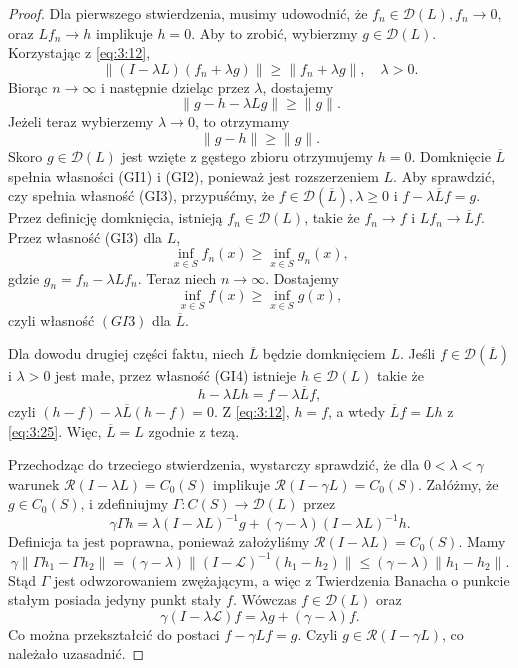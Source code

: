 \documentclass{article}
\begin{document}
	\begin{proof}
		Dla pierwszego stwierdzenia, musimy udowodnić, że
		\( f_n \in \mathcal{D}(L), f_n \to 0 \),
		oraz \( Lf_n \to h \) implikuje \( h = 0 \).
		Aby to zrobić, wybierzmy \( g \in \mathcal{D}(L) \).
		Korzystając z \eqref{eq:3:12},
		\begin{equation*}
			\|(I - \lambda L)(f_n + \lambda g)\|
			\geq \|f_n + \lambda g\|,
			\quad \lambda > 0.
		\end{equation*}
		Biorąc \( n \to \infty \) i następnie dzieląc przez \( \lambda \), dostajemy
		\[
			\|g - h - \lambda Lg\| \geq \|g\|.
		\]
		Jeżeli teraz wybierzemy \( \lambda \to 0 \), to otrzymamy
		\begin{equation*}
			\| g-h \| \geq \|g\|.
		\end{equation*}
		Skoro $g\in \mathcal{D}(L)$ jest wzięte z gęstego zbioru otrzymujemy
		\( h = 0 \). Domknięcie \( \overline{L} \) spełnia własności (GI1) i (GI2),
		ponieważ jest rozszerzeniem \( L \). Aby sprawdzić, czy spełnia własność (GI3),
		przypuśćmy, że \( f \in \mathcal{D}(\overline{L}), \lambda \geq 0 \) i
		$f - \lambda \overline{L}f = g$. 
		Przez definicję domknięcia, istnieją $f_n \in \mathcal{D}(L)$,
		takie że $f_n \to f$ i $Lf_n \to \overline{L}f$. Przez własność (GI3) dla $L$,
		\[
			\inf_{x \in S} f_n(x) \geq \inf_{x \in S} g_n(x),
		\]
		gdzie $g_n = f_n - \lambda Lf_n$. Teraz niech $n \to \infty$. Dostajemy
		\[
			\inf_{x \in S} f(x) \geq \inf_{x \in S} g(x),
		\]
		czyli własność $(GI3)$ dla $\overline{L}$.

		Dla dowodu drugiej części faktu, niech $\overline{L}$ będzie domknięciem $L$.
		Jeśli $f \in \mathcal{D}(\overline{L})$ i $\lambda > 0$ jest małe, przez własność (GI4)
		istnieje $h \in \mathcal{D}(L)$ takie że
		\begin{equation}\label{eq:3:25}
			h - \lambda Lh = f - \lambda \overline{L}f,
		\end{equation}
		czyli $(h - f) - \lambda \overline{L}(h - f) = 0$.
		Z \eqref{eq:3:12}, $h = f$, a wtedy $\overline{L}f = Lh$ z \eqref{eq:3:25}.
		Więc, $\overline{L} = L$ zgodnie z tezą.

	Przechodząc do trzeciego stwierdzenia, 
	wystarczy sprawdzić, że dla $0 < \lambda < \gamma$ warunek 
	$\mathcal{R}(I - \lambda L) = C_0(S)$  implikuje $\mathcal{R}(I - \gamma L) = C_0(S)$. 
	Załóżmy, że $g \in C_0(S)$, i zdefiniujmy $\Gamma : C(S) \to \mathcal{D}(L)$ przez
	\[
		\gamma \Gamma h 
		= \lambda (I - \lambda L)^{-1} g + (\gamma - \lambda)(I - \lambda L)^{-1} h.
	\]
	Definicja ta jest poprawna, ponieważ założyliśmy 
	$\mathcal{R}(I - \lambda L) = C_0(S)$. Mamy
	\[
		\gamma \| \Gamma h_1 - \Gamma h_2 \| 
		= (\gamma - \lambda) \| (I - \mathcal{L})^{-1} (h_1 - h_2) \| 
		\leq (\gamma - \lambda) \| h_1 - h_2 \|.
	\]
	Stąd $\Gamma$ jest odwzorowaniem zwężającym, a więc z Twierdzenia Banacha o punkcie stałym 
	posiada jedyny punkt stały $f$. 
	Wówczas $f \in \mathcal{D}(L)$ oraz
	\[
		\gamma (I - \lambda \mathcal{L}) f 
		= \lambda g + (\gamma - \lambda) f.
	\]
	Co można przekształcić do postaci $f - \gamma L f = g$.
	Czyli $g \in \mathcal{R}(I - \gamma L)$, co należało uzasadnić.


\end{proof}
\end{document}
